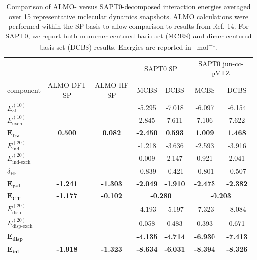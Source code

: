 \documentclass[%
  class = book,%
  crop = false,%
  float = true,%
  multi = true,%
  preview = false,%
]{standalone}
\begin{document}
\begin{table}
  \centering
  \caption[Comparison of ALMO and SAPT interaction energies for MD clusters]{Comparison of ALMO- versus SAPT0-decomposed interaction energies averaged over \num{15} representative molecular dynamics snapshots. ALMO calculations were performed within the SP basis to allow comparison to results from Ref. 14. For SAPT0, we report both monomer-centered basis set (MCBS) and dimer-centered basis set (DCBS) results. Energies are reported in \si{\kcal\per\mole}.}
  \label{paper_02:tab:6}
  \begin{tabular}{lcccccc}
    & & & \multicolumn{2}{c}{SAPT0 SP} & \multicolumn{2}{c}{SAPT0 jun-cc-pVTZ} \\
    component & ALMO-DFT SP & ALMO-HF SP & MCBS & DCBS & MCBS & DCBS \\
    \(E_{\text{el}}^{(10)}\) & \textemdash{} & \textemdash{} & -5.295 & -7.018 & -6.097 & -6.154 \\
    \(E_{\text{exch}}^{(10)}\) & \textemdash{} & \textemdash{} & 2.845 & 7.611 & 7.106 & 7.622 \\
    \(\mathbf{E_{\textbf{frz}}}\) & \textbf{0.500} & \textbf{0.082} & \textbf{-2.450} & \textbf{0.593} & \textbf{1.009} & \textbf{1.468} \\
    \(E_{\text{ind}}^{(20)}\) & \textemdash{} & \textemdash{} & -1.218 & -3.636 & -2.593 & -3.916 \\
    \(E_{\text{ind-exch}}^{(20)}\) & \textemdash{} & \textemdash{} & 0.009 & 2.147 & 0.921 & 2.041 \\
    \(\delta_{\text{HF}}\) & \textemdash{} & \textemdash{} & -0.839 & -0.421 & -0.801 & -0.507 \\
    \(\mathbf{E_{\textbf{pol}}}\) & \textbf{-1.241} & \textbf{-1.303} & \textbf{-2.049} & \textbf{-1.910} & \textbf{-2.473} & \textbf{-2.382} \\
    \(\mathbf{E_{\textbf{CT}}}\) & \textbf{-1.177} & \textbf{-0.102} & \multicolumn{2}{c}{\textbf{-0.280}} & \multicolumn{2}{c}{\textbf{-0.203}} \\
    \(E_{\text{disp}}^{(20)}\) & \textemdash{} & \textemdash{} & -4.193 & -5.197 & -7.323 & -8.084 \\
    \(E_{\text{disp-exch}}^{(20)}\) & \textemdash{} & \textemdash{} & 0.058 & 0.483 & 0.393 & 0.671 \\
    \(\mathbf{E_{\textbf{disp}}}\) & \textbf{\textemdash{}} & \textbf{\textemdash{}} & \textbf{-4.135} & \textbf{-4.714} & \textbf{-6.930} & \textbf{-7.413} \\
    \(\mathbf{E_{\textbf{int}}}\) & \textbf{-1.918} & \textbf{-1.323} & \textbf{-8.634} & \textbf{-6.031} & \textbf{-8.394} & \textbf{-8.326}
  \end{tabular}
\end{table}
\end{document}
